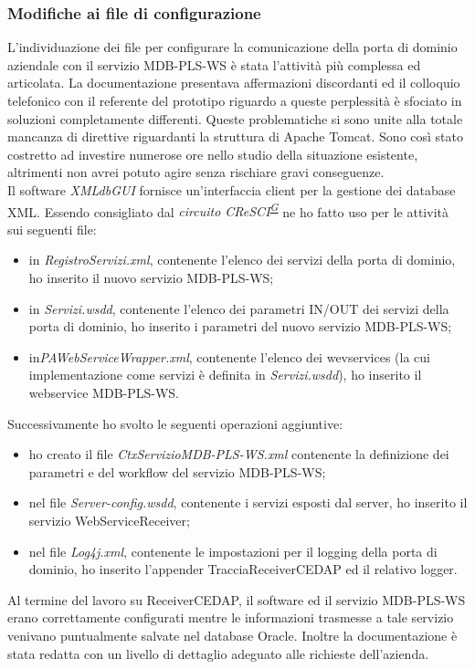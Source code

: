 \documentclass[a4paper]{article}
\begin{document}
\subsubsection{Modifiche ai file di configurazione}
L'individuazione dei file per configurare la comunicazione della porta di dominio aziendale con il servizio MDB-PLS-WS è stata l'attività più complessa ed articolata. La documentazione presentava affermazioni discordanti ed il colloquio telefonico con il referente del prototipo riguardo a queste perplessità è sfociato in soluzioni completamente differenti. Queste problematiche si sono unite alla totale mancanza di direttive riguardanti la struttura di Apache Tomcat. Sono così stato costretto ad investire numerose ore nello studio della situazione esistente, altrimenti non avrei potuto agire senza rischiare gravi conseguenze.
\\
Il software \textit{XMLdbGUI} fornisce un'interfaccia client per la gestione dei database XML. Essendo consigliato dal \textit{circuito CReSCI\textsuperscript{\hyperref[sec:gl]{G}}} ne ho fatto uso per le attività sui seguenti file:
\begin{itemize}
	    \item in \textit{RegistroServizi.xml}, contenente l'elenco dei servizi della porta di dominio, ho inserito il nuovo servizio MDB-PLS-WS;
	\item in \textit{Servizi.wsdd}, contenente l'elenco dei parametri IN/OUT dei servizi della porta di dominio, ho inserito i parametri del nuovo servizio MDB-PLS-WS;
    \item in\textit{PAWebServiceWrapper.xml}, contenente l'elenco dei wevservices (la cui implementazione come servizi è definita in \textit{Servizi.wsdd}), ho inserito il webservice MDB-PLS-WS.
\end{itemize}
Successivamente ho svolto le seguenti operazioni aggiuntive:
\begin{itemize}
	\item ho creato il file \textit{CtxServizioMDB-PLS-WS.xml} contenente la definizione dei parametri e del workflow del servizio MDB-PLS-WS;
    \item nel file \textit{Server-config.wsdd}, contenente i servizi esposti dal server, ho inserito il servizio WebServiceReceiver;
    \item nel file \textit{Log4j.xml}, contenente le impostazioni per il logging della porta di dominio, ho inserito l'appender TracciaReceiverCEDAP ed il relativo logger.
\end{itemize}
Al termine del lavoro su ReceiverCEDAP, il software ed il servizio MDB-PLS-WS erano correttamente configurati mentre le informazioni trasmesse a tale servizio venivano puntualmente salvate nel database Oracle. Inoltre la documentazione è stata redatta con un livello di dettaglio adeguato alle richieste dell'azienda.
\end{document}
